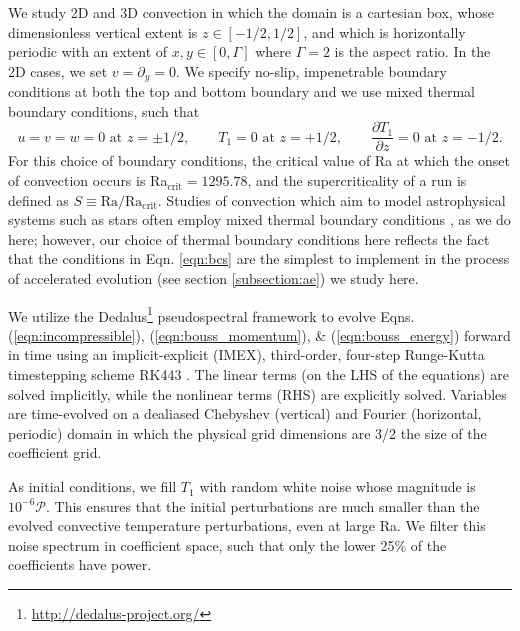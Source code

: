 \documentclass[aps, pre, onecolumn, nofootinbib, notitlepage, groupedaddress, amsfonts, amssymb, amsmath, longbibliography]{revtex4-1}
\begin{document}
We study 2D and 3D convection in which the domain is a cartesian box, 
whose dimensionless vertical extent is $z \in [-1/2, 1/2]$, 
and which is horizontally periodic with an extent of $x, y \in [0, \Gamma]$ where $\Gamma = 2$ is the aspect
ratio. 
In the 2D cases, we set $v = \partial_y = 0$.
We specify no-slip, impenetrable boundary conditions at both the top and
bottom boundary and we use mixed thermal boundary conditions, such that
\begin{equation}
u = v = w = 0 \, \, \text{at}\,\,z = \pm 1/2, \qquad T_1 = 0 \,\,\text{at}\,\, z=+1/2, \qquad
\frac{\partial T_1}{\partial z} = 0\,\,\text{at}\,\,z=-1/2.
\label{eqn:bcs}
\end{equation}
For this choice of boundary conditions, the critical value of Ra at which
the onset of convection occurs is Ra$_{\text{crit}} = 1295.78$, and the
supercriticality of a run is defined as $S \equiv \text{Ra}/\text{Ra}_{\text{crit}}$.
Studies of convection which aim to model
astrophysical systems such as stars often employ mixed thermal
boundary conditions \cite{hurlburt&all1984, cattaneo&all1991, korre&all2017},
as we do here; however, our choice of thermal boundary conditions here
reflects the fact that the conditions in Eqn. \ref{eqn:bcs} are the simplest
to implement in the process of accelerated evolution (see section \ref{subsection:ae})
we study here.

We utilize the 
Dedalus\footnote{\url{http://dedalus-project.org/}} 
pseudospectral framework \cite{burns&all2016} to evolve  
Eqns. (\ref{eqn:incompressible}), (\ref{eqn:bouss_momentum}), \& (\ref{eqn:bouss_energy}) 
forward in time
using an implicit-explicit (IMEX), third-order, four-step 
Runge-Kutta timestepping scheme RK443 \cite{ascher&all1997}.  
The linear terms (on the LHS of the equations) are solved implicitly,
while the nonlinear terms (RHS) are explicitly solved.
Variables are time-evolved on a dealiased Chebyshev (vertical)
and Fourier (horizontal, periodic) domain in which the
physical grid dimensions are 3/2 the size of the coefficient grid.  

As initial conditions, we fill $T_1$ with
random white noise whose magnitude is $10^{-6}\mathcal{P}$.
This ensures that the initial perturbations are much smaller than the
evolved convective temperature perturbations, even at large Ra.
We filter this noise spectrum in coefficient space, 
such that only the lower 25\% of the coefficients
have power.
\end{document}
